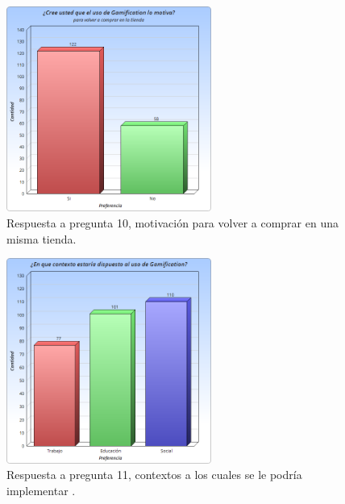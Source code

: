\begin{figure}[!htb]
  \centering
  \includegraphics[width=0.6\textwidth]{images/Graficos/graf_5_11.png}
  \caption[Gráfico pregunta 10, motivación para volver a comprar en una misma tienda.]{Respuesta a pregunta 10, motivación para volver a comprar en una misma tienda.}
  \label{fig:chart5.11}
\end{figure}

\begin{figure}[!htb]
  \centering
  \includegraphics[width=0.6\textwidth]{images/Graficos/graf_5_12.png}
  \caption[Gráfico pregunta 11, contextos a los cuales se le podría implementar {\gam}.]{Respuesta a pregunta 11, contextos a los cuales se le podría implementar {\gam}.}
  \label{fig:chart5.12}
\end{figure}


